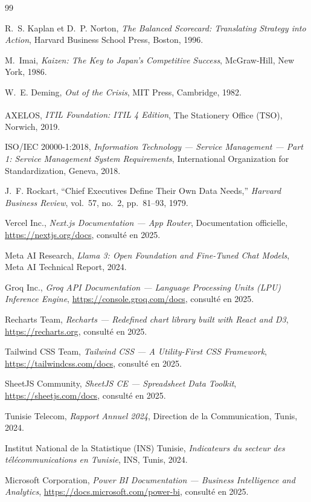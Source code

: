 \documentclass[10pt,a4paper]{report}
\begin{document}
\begin{thebibliography}{99}

R.~S. Kaplan et D.~P. Norton, \textit{The Balanced Scorecard: Translating Strategy into Action}, Harvard Business School Press, Boston, 1996.

M.~Imai, \textit{Kaizen: The Key to Japan's Competitive Success}, McGraw-Hill, New York, 1986.

W.~E. Deming, \textit{Out of the Crisis}, MIT Press, Cambridge, 1982.

AXELOS, \textit{ITIL\textsuperscript{\textregistered} Foundation: ITIL 4 Edition}, The Stationery Office (TSO), Norwich, 2019.

ISO/IEC 20000-1:2018, \textit{Information Technology --- Service Management --- Part 1: Service Management System Requirements}, International Organization for Standardization, Geneva, 2018.

J.~F. Rockart, ``Chief Executives Define Their Own Data Needs,'' \textit{Harvard Business Review}, vol.~57, no.~2, pp.~81--93, 1979.

Vercel Inc., \textit{Next.js Documentation --- App Router}, Documentation officielle, \url{https://nextjs.org/docs}, consulté en 2025.

Meta AI Research, \textit{Llama 3: Open Foundation and Fine-Tuned Chat Models}, Meta AI Technical Report, 2024.

Groq Inc., \textit{Groq API Documentation --- Language Processing Units (LPU) Inference Engine}, \url{https://console.groq.com/docs}, consulté en 2025.

Recharts Team, \textit{Recharts --- Redefined chart library built with React and D3}, \url{https://recharts.org}, consulté en 2025.

Tailwind CSS Team, \textit{Tailwind CSS --- A Utility-First CSS Framework}, \url{https://tailwindcss.com/docs}, consulté en 2025.

SheetJS Community, \textit{SheetJS CE --- Spreadsheet Data Toolkit}, \url{https://sheetjs.com/docs}, consulté en 2025.

Tunisie Telecom, \textit{Rapport Annuel 2024}, Direction de la Communication, Tunis, 2024.

Institut National de la Statistique (INS) Tunisie, \textit{Indicateurs du secteur des télécommunications en Tunisie}, INS, Tunis, 2024.

Microsoft Corporation, \textit{Power BI Documentation --- Business Intelligence and Analytics}, \url{https://docs.microsoft.com/power-bi}, consulté en 2025.

\end{thebibliography}
\end{document}
